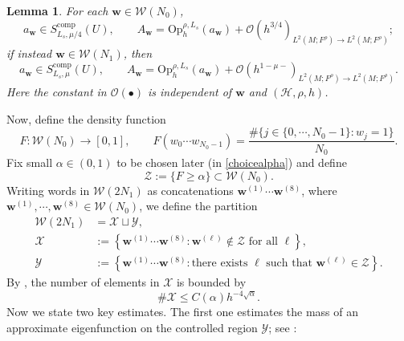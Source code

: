 \documentclass[11pt,oneside,reqno]{amsart}
\newtheorem{lemma}[theorem]{Lemma}
\theoremstyle{definition}
\numberwithin{equation}{section}
\theoremstyle{plain}
\begin{document}
\begin{lemma}\label{quantizationoflongwordsymbol}
For each $\mathbf{w} \in \mathcal{W}\left(N_0\right)$,
\begin{equation}\label{refinedwordquant}
a_{\mathbf{w}} \in S_{L_s, \mu / 4}^{\mathrm{comp}}(U), \qquad A_{\mathbf{w}}=\mathrm{Op}_h^{\rho, L_s}(a_{\mathbf{w}})+\mathcal{O}(h^{3/4})_{L^2(M;F^\rho) \rightarrow L^2(M;F^\rho)} ;
\end{equation}
if instead $\mathbf{w} \in \mathcal{W}(N_1)$, then
\begin{equation}\label{longerwordquant}
a_{\mathbf{w}} \in S_{L_s, \mu}^{\mathrm{comp}}(U), \qquad A_{\mathbf{w}}=\mathrm{Op}_h^{\rho, L_s}(a_{\mathbf{w}})+\mathcal{O}(h^{1-\mu-})_{L^2(M;F^\rho) \rightarrow L^2(M;F^\rho)} .
\end{equation}
Here the constant in $\mathcal{O}(\bullet)$ is independent of $\mathbf{w}$ and $(\mathcal{H},\rho,h)$.
\end{lemma}
Now, define the density function
\begin{equation}\label{defofdensityoffunc}
F: \mathcal{W}\left(N_0\right) \rightarrow[0,1], \qquad F(w_0 \cdots w_{N_0-1})=\frac{\# \big\{j \in \{0, \cdots, N_0-1\} : w_j=1\big\}}{N_0}.
\end{equation}
Fix small $\alpha \in(0,1)$ to be chosen later (in \eqref{choicealpha}) and define
\begin{equation*}
    \mathcal{Z}:=\{F \geq \alpha\} \subset \mathcal{W}(N_0) .
\end{equation*}
Writing words in $\mathcal{W}(2 N_1)$ as concatenations $\mathbf{w}^{(1)} \cdots \mathbf{w}^{(8)}$, where $\mathbf{w}^{(1)}, \cdots, \mathbf{w}^{(8)} \in \mathcal{W}(N_0)$, we define the partition
\begin{equation}\label{partitionofregions}
\begin{aligned}
\mathcal{W}(2 N_1) & =\mathcal{X} \sqcup \mathcal{Y}, \\
\mathcal{X} & :=\left\{\mathbf{w}^{(1)} \cdots \mathbf{w}^{(8)} : \mathbf{w}^{(\ell)} \notin \mathcal{Z} \text { for all } \ell\right\} ,\\
\mathcal{Y} & :=\left\{\mathbf{w}^{(1)} \cdots \mathbf{w}^{(8)} : \text {there exists } \ell \text { such that } \mathbf{w}^{(\ell)} \in \mathcal{Z}\right\}.
\end{aligned}
\end{equation}
By \cite[Lemma 3.3]{dyatlov2018semiclassical}, the number of elements in $\mathcal{X}$ is bounded by
\begin{equation}\label{numberofuncontrolwords}
\# \mathcal{X} \leq C(\alpha)h^{-4 \sqrt{\alpha}} .
\end{equation}
Now we state two key estimates. The first one estimates the mass of an approximate eigenfunction on the controlled region $\mathcal{Y}$; see \cite[Proposition 3.4]{dyatlov2018semiclassical}:
\end{document}
